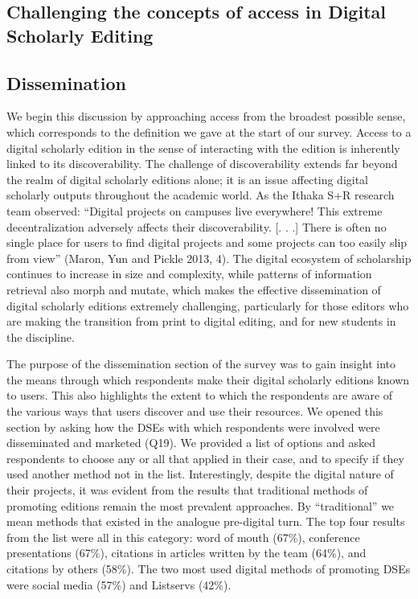 \begin{paper}
\section*{Challenging the concepts of access in Digital Scholarly
Editing}

\subsection{Dissemination}

We begin this discussion by approaching access from the broadest
possible sense, which corresponds to the definition we gave at the start
of our survey. Access to a digital scholarly edition in the sense of
interacting with the edition is inherently linked to its
discoverability. The challenge of discoverability extends far beyond the
realm of digital scholarly editions alone; it is an issue affecting
digital scholarly outputs throughout the academic world. As the Ithaka
S+R research team observed: ``Digital projects on campuses live
everywhere! This extreme decentralization adversely affects their
discoverability. {[}. . .{]} There is often no single place for users to
find digital projects and some projects can too easily slip from view''
(Maron, Yun and Pickle 2013, 4). The digital ecosystem of scholarship
continues to increase in size and complexity, while patterns of
information retrieval also morph and mutate, which makes the effective
dissemination of digital scholarly editions extremely challenging,
particularly for those editors who are making the transition from print
to digital editing, and for new students in the discipline.

The purpose of the dissemination section of the survey was to gain
insight into the means through which respondents make their digital
scholarly editions known to users. This also highlights the extent to
which the respondents are aware of the various ways that users discover
and use their resources. We opened this section by asking how the DSEs
with which respondents were involved were disseminated and marketed
(Q19). We provided a list of options and asked respondents to choose any
or all that applied in their case, and to specify if they used another
method not in the list. Interestingly, despite the digital nature of
their projects, it was evident from the results that traditional methods
of promoting editions remain the most prevalent approaches. By
``traditional'' we mean methods that existed in the analogue pre-digital
turn. The top four results from the list were all in this category: word
of mouth (67\%), conference presentations (67\%), citations in articles
written by the team (64\%), and citations by others (58\%). The two most
used digital methods of promoting DSEs were social media (57\%) and
Listservs (42\%).


\end{paper}
